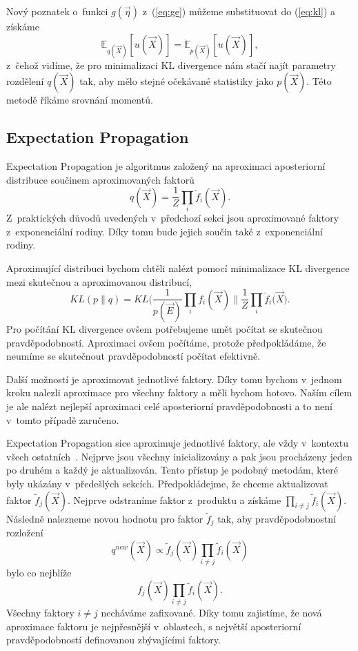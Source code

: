 Nový poznatek o~funkci $g(\vec\eta)$ z~(\ref{eq:ge}) můžeme substituovat do (\ref{eq:kl}) a získáme
\begin{equation}
\mathbb{E}_{q(\vec{X})}[u(\vec{X})] = \mathbb{E}_{p(\vec{X})}[u(\vec{X})],
\label{eq:ee}
\end{equation}
z~čehož vidíme, že pro minimalizaci KL divergence nám stačí najít parametry rozdělení $q(\vec{X})$ tak, aby mělo stejné očekávané statistiky jako $p(\vec{X})$. 
Této metodě říkáme srovnání momentů.

\subsection{Expectation Propagation}
\label{sec:ep}

Expectation Propagation je algoritmus založený na aproximaci aposteriorní distribuce součinem aproximovaných faktorů
\begin{equation}
q(\vec{X}) = \frac{1}{Z} \prod_i \tilde{f}_i(\vec{X}).
\end{equation}
Z~praktických důvodů uvedených v~předchozí sekci jsou aproximované faktory z~exponenciální rodiny.
Díky tomu bude jejich součin také z~exponenciální rodiny.

Aproximující distribuci bychom chtěli nalézt pomocí minimalizace KL divergence mezi skutečnou a aproximovanou distribucí,
\begin{equation}
KL(p \| q) = KL\bigg(\frac{1}{p(\vec{E})} \prod_i f_i(\vec{X}) \bigg\| \frac{1}{Z} \prod_i \tilde{f}_i(\vec{X} \bigg).
\end{equation}
Pro počítání KL divergence ovšem potřebujeme umět počítat se skutečnou pravděpodobností.
Aproximaci ovšem počítáme, protože předpokládáme, že neumíme se skutečnout pravděpodobností počítat efektivně.

Další možností je aproximovat jednotlivé faktory.
Díky tomu bychom v~jednom kroku nalezli aproximace pro všechny faktory a měli bychom hotovo.
Naším cílem je ale nalézt nejlepší aproximaci celé aposteriorní pravděpodobnosti a to není v~tomto případě zaručeno.

Expectation Propagation sice aproximuje jednotlivé faktory, ale vždy v~kontextu všech ostatních~\cite{bishop2006pattern}.
Nejprve jsou všechny inicializovány a pak jsou procházeny jeden po druhém a každý je aktualizován.
Tento přístup je podobný metodám, které byly ukázány v~předešlých sekcích.
Předpokládejme, že chceme aktualizovat faktor $\tilde{f}_j (\vec{X})$.
Nejprve odstraníme faktor z~produktu a získáme $\prod_{i \ne j} \tilde{f}_i(\vec{X})$.
Následně nalezneme novou hodnotu pro faktor $\tilde{f}_j$ tak, aby pravděpodobnostní rozložení
\begin{equation}
q^{new}(\vec{X}) \propto \tilde{f}_j(\vec{X}) \prod_{i \ne j} \tilde{f}_i(\vec{X})
\label{eq:qnew}
\end{equation}
bylo co nejblíže 
\begin{equation}
f_j(\vec{X})\prod_{i \ne j} \tilde{f}_i(\vec{X}).
\end{equation}
Všechny faktory $i \ne j$ necháváme zafixované. 
Díky tomu zajistíme, že nová aproximace faktoru je nejpřesnější v~oblastech, s největší aposteriorní pravděpodobností definovanou zbývajícími faktory.

